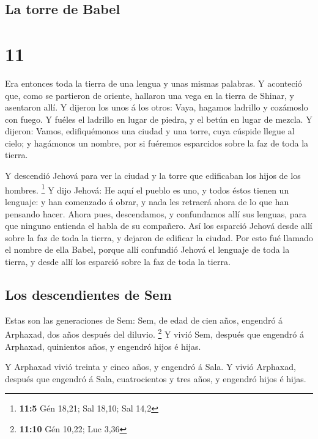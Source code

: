 \hypertarget{la-torre-de-babel}{%
\subsection{La torre de Babel}\label{la-torre-de-babel}}

\hypertarget{section-10}{%
\section{11}\label{section-10}}

 Era entonces toda la tierra de una lengua y unas mismas
palabras.  Y aconteció que, como se partieron de oriente,
hallaron una vega en la tierra de Shinar, y asentaron allí.
 Y dijeron los unos á los otros: Vaya, hagamos ladrillo y
cozámoslo con fuego. Y fuéles el ladrillo en lugar de piedra, y el betún
en lugar de mezcla.  Y dijeron: Vamos, edifiquémonos una
ciudad y una torre, cuya cúspide llegue al cielo; y hagámonos un nombre,
por si fuéremos esparcidos sobre la faz de toda la tierra.

 Y descendió Jehová para ver la ciudad y la torre que
edificaban los hijos de los hombres. \footnote{\textbf{11:5} Gén 18,21;
  Sal 18,10; Sal 14,2}  Y dijo Jehová: He aquí el pueblo
es uno, y todos éstos tienen un lenguaje: y han comenzado á obrar, y
nada les retraerá ahora de lo que han pensando hacer. 
Ahora pues, descendamos, y confundamos allí sus lenguas, para que
ninguno entienda el habla de su compañero.  Así los
esparció Jehová desde allí sobre la faz de toda la tierra, y dejaron de
edificar la ciudad.  Por esto fué llamado el nombre de
ella Babel, porque allí confundió Jehová el lenguaje de toda la tierra,
y desde allí los esparció sobre la faz de toda la tierra.

\hypertarget{los-descendientes-de-sem}{%
\subsection{Los descendientes de Sem}\label{los-descendientes-de-sem}}

 Estas son las generaciones de Sem: Sem, de edad de cien
años, engendró á Arphaxad, dos años después del diluvio. \footnote{\textbf{11:10}
  Gén 10,22; Luc 3,36}  Y vivió Sem, después que engendró
á Arphaxad, quinientos años, y engendró hijos é hijas.

 Y Arphaxad vivió treinta y cinco años, y engendró á
Sala.  Y vivió Arphaxad, después que engendró á Sala,
cuatrocientos y tres años, y engendró hijos é hijas.

